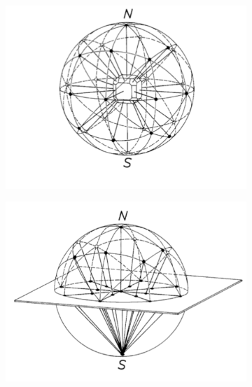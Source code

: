 \begin{figure}[h]
    \begin{subfigure}[b]{\picwidth}
    \includegraphics[width=\textwidth]{figures/stereo_1}
    \caption{}
    \label{fig:stereo_1}
    \end{subfigure}\qquad
    \begin{subfigure}[b]{\picwidth}
    \includegraphics[width=\textwidth]{figures/stereo_2}
    \caption{}
    \label{fig:stereo_2}
    \end{subfigure}
    \begin{subfigure}[b]{\picwidth}

\end{subfigure}
\end{figure}
